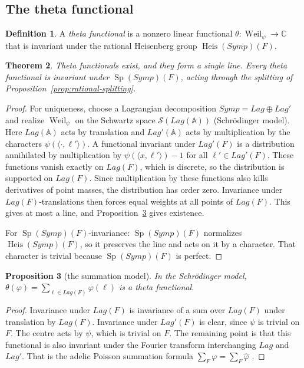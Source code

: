 \documentclass[11pt]{amsart}
\newtheorem{theorem}{Theorem}[section]
\newtheorem{proposition}[theorem]{Proposition}
\theoremstyle{definition}
\newtheorem{definition}[theorem]{Definition}
\theoremstyle{remark}
\newcommand{\Symp}{\mathit{Symp}}
\newcommand{\Lag}{\mathit{Lag}}
\DeclareMathOperator{\Heis}{Heis}
\DeclareMathOperator{\Sp}{Sp}
\DeclareMathOperator{\Weil}{Weil}
\newcommand{\A}{\mathbb{A}}
\newcommand{\C}{\mathbb{C}}
\begin{document}
\subsection{The theta functional}
\begin{definition}\label{def:theta}
A \emph{theta functional} is a nonzero linear functional $\theta\colon\Weil_\psi\to\C$ that is invariant under the rational Heisenberg group $\Heis(\Symp)(F)$.
\end{definition}

\begin{theorem}\label{thm:theta-unique}
Theta functionals exist, and they form a single line. Every theta functional is invariant under $\Sp(\Symp)(F)$, acting through the splitting of Proposition~\ref{prop:rational-splitting}.
\end{theorem}

\begin{proof}
For uniqueness, choose a Lagrangian decomposition $\Symp=\Lag\oplus\Lag'$ and realize $\Weil_\psi$ on the Schwartz space $\mathcal S(\Lag(\A))$ (Schr\"odinger model). Here $\Lag(\A)$ acts by translation and $\Lag'(\A)$ acts by multiplication by the characters $\psi(\langle\cdot,\ell'\rangle)$. A functional invariant under $\Lag'(F)$ is a distribution annihilated by multiplication by $\psi(\langle x,\ell'\rangle)-1$ for all $\ell'\in\Lag'(F)$. These functions vanish exactly on $\Lag(F)$, which is discrete, so the distribution is supported on $\Lag(F)$. Since multiplication by these functions also kills derivatives of point masses, the distribution has order zero. Invariance under $\Lag(F)$-translations then forces equal weights at all points of $\Lag(F)$. This gives at most a line, and Proposition~\ref{prop:poisson} gives existence.

For $\Sp(\Symp)(F)$-invariance: $\Sp(\Symp)(F)$ normalizes $\Heis(\Symp)(F)$, so it preserves the line and acts on it by a character. That character is trivial because $\Sp(\Symp)(F)$ is perfect.
\end{proof}

\begin{proposition}[the summation model]\label{prop:poisson}
In the Schr\"odinger model, $\theta(\varphi)=\sum_{\ell\in\Lag(F)}\varphi(\ell)$ is a theta functional.
\end{proposition}

\begin{proof}
Invariance under $\Lag(F)$ is invariance of a sum over $\Lag(F)$ under translation by $\Lag(F)$. Invariance under $\Lag'(F)$ is clear, since $\psi$ is trivial on $F$. The centre acts by $\psi$, which is trivial on $F$. The remaining point is that this functional is also invariant under the Fourier transform interchanging $\Lag$ and $\Lag'$. That is the adelic Poisson summation formula $\sum_{F}\varphi=\sum_F\widehat\varphi$ \cite[\S4.2]{Tate-thesis}.
\end{proof}
\end{document}
